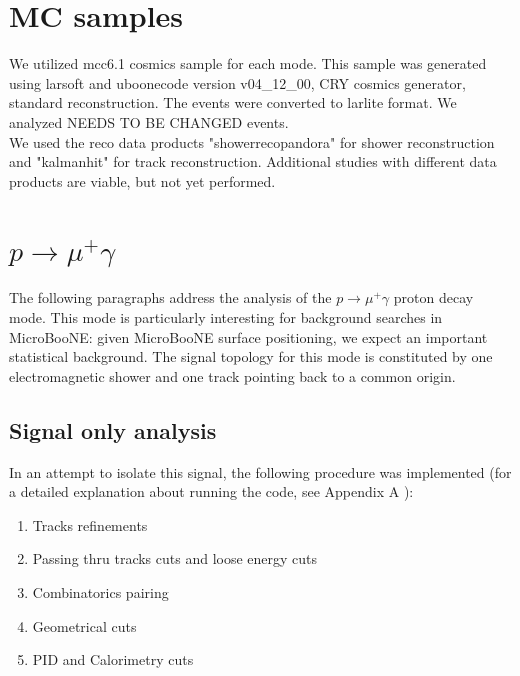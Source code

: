 \documentclass[a4paper, 10pt]{article}
\begin{document}
\section{MC samples}
 We utilized mcc6.1 cosmics  sample for each mode. This sample was generated using larsoft and uboonecode version v04\_12\_00, CRY cosmics generator, standard reconstruction. The events were converted to larlite format. We analyzed  NEEDS TO BE CHANGED events. \\
We used the reco data products "showerrecopandora" for shower reconstruction and "kalmanhit" for track reconstruction. Additional studies with different data products are viable, but not  yet performed.\\


\section{$p \rightarrow \mu^{+} \gamma$}
The following paragraphs address the analysis of the  $p \rightarrow \mu^{+} \gamma$  proton decay mode. This mode is particularly interesting for background searches in MicroBooNE: given MicroBooNE surface positioning, we expect an important statistical background.
The signal topology for this mode is constituted by one electromagnetic shower and one track pointing back to a common origin.


\subsection{Signal only analysis}

In an attempt to isolate this signal, the following procedure was implemented (for a detailed explanation about running the code, see Appendix A ):
\begin{enumerate}[topsep=10pt,itemsep=-1ex,partopsep=10pt,parsep=1ex]
\item Tracks refinements
\item Passing thru tracks cuts and loose energy cuts
\item Combinatorics pairing 
\item Geometrical cuts
\item PID and Calorimetry cuts 
\end{enumerate}
\end{document}
